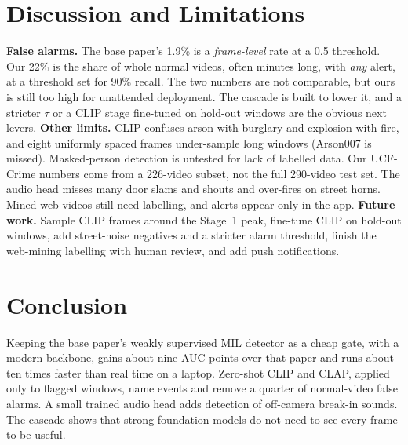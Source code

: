 \documentclass[conference,a4paper]{IEEEtran}
\begin{document}
\section{Discussion and Limitations}
\textbf{False alarms.} The base paper's 1.9\% is a \emph{frame-level} rate at a 0.5 threshold. Our 22\% is the
share of whole normal videos, often minutes long, with \emph{any} alert, at a threshold set for 90\% recall.
The two numbers are not comparable, but ours is still too high for unattended deployment. The cascade is built to
lower it, and a stricter $\tau$ or a CLIP stage fine-tuned on hold-out windows are the obvious next levers.
\textbf{Other limits.} CLIP confuses arson with burglary and explosion with fire, and eight uniformly spaced frames
under-sample long windows (Arson007 is missed). Masked-person detection is untested for lack of labelled data. Our
UCF-Crime numbers come from a 226-video subset, not the full 290-video test set. The audio head misses many door
slams and shouts and over-fires on street horns. Mined web videos still need labelling, and alerts appear only in
the app.
\textbf{Future work.} Sample CLIP frames around the Stage~1 peak, fine-tune CLIP on hold-out windows, add
street-noise negatives and a stricter alarm threshold, finish the web-mining labelling with human review, and add
push notifications.

\section{Conclusion}
Keeping the base paper's weakly supervised MIL detector as a cheap gate, with a modern backbone, gains about nine AUC
points over that paper and runs about ten times faster than real time on a laptop. Zero-shot CLIP and CLAP, applied
only to flagged windows, name events and remove a quarter of normal-video false alarms. A small trained audio head
adds detection of off-camera break-in sounds. The cascade shows that strong foundation models do not need to see
every frame to be useful.
\end{document}
